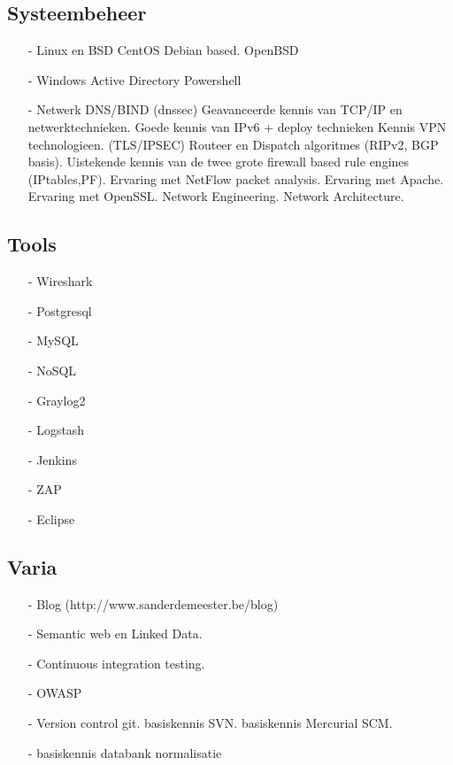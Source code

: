 \documentclass[margin, 10pt]{res} %
\begin{document}
\subsection{Systeembeheer}
\begin{itemize}
\item[-] Linux en BSD
\subitem CentOS
\subitem Debian based.
\subitem OpenBSD
\item[-] Windows
\subitem Active Directory
\subitem Powershell
\end{itemize}
\begin{itemize}
\item[-] Netwerk
\subitem DNS/BIND (dnssec)
\subitem Geavanceerde kennis van TCP/IP en netwerktechnieken.
\subitem Goede kennis van IPv6 + deploy technieken
\subitem Kennis VPN technologieen. (TLS/IPSEC)
\subitem Routeer en Dispatch algoritmes (RIPv2, BGP basis).
\subitem Uistekende kennis van de twee grote firewall based rule engines (IPtables,PF).
\subitem Ervaring met NetFlow packet analysis.
\subitem Ervaring met Apache.
\subitem Ervaring met OpenSSL.
\subitem Network Engineering.
\subitem Network Architecture.
\end{itemize}
\newpage
\begin{multicols}{2}
\subsection*{Tools}
\begin{enumerate}
\item[-] Wireshark
\item[-] Postgresql
\item[-] MySQL
\item[-] NoSQL
\item[-] Graylog2
\item[-] Logstash
\item[-] Jenkins
\item[-] ZAP
\item[-] Eclipse
\end{enumerate}
\end{multicols}
\subsection{Varia}
\begin{enumerate}
\item[-] Blog (http://www.sanderdemeester.be/blog)
\item[-] Semantic web en Linked Data.
\item[-] Continuous integration testing.
\item[-] OWASP
\item[-] Version control
\subitem git.
\subitem basiskennis SVN.
\subitem basiskennis Mercurial SCM.
\item[-] basiskennis databank normalisatie
\end{enumerate}
\end{document}

